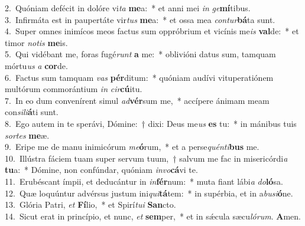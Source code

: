 {2.~}Quóniam defécit in dolóre vi\textit{ta} \textbf{me}a:~* et anni mei \textit{in} \textit{ge}\textbf{mí}tibus.\\
{3.~}Infirmáta est in paupertáte vir\textit{tus} \textbf{me}a:~* et ossa mea \textit{con}\textit{tur}\textbf{bá}ta sunt.\\
{4.~}Super omnes inimícos meos factus sum oppróbrium et vicínis me\textit{is} \textbf{val}de:~* et timor \textit{no}\textit{tis} \textbf{me}is.\\
{5.~}Qui vidébant me, foras fugé\textit{runt} \textbf{a} me:~* oblivióni datus sum, tamquam mórtu\textit{us} \textit{a} \textbf{cor}de.\\
{6.~}Factus sum tamquam \textit{vas} \textbf{pér}ditum:~* quóniam audívi vituperatiónem multórum commorántium \textit{in} \textit{cir}\textbf{cú}itu.\\
{7.~}In eo dum convenírent simul \textit{ad}\textbf{vér}sum me,~* accípere ánimam meam con\textit{si}\textit{li}\textbf{á}ti sunt.\\
{8.~}Ego autem in te sperávi, Dómine:~† dixi: Deus me\textit{us} \textbf{es} tu:~* in mánibus tuis \textit{sor}\textit{tes} \textbf{me}æ.\\
{9.~}Eripe me de manu inimicórum \textit{me}\textbf{ó}rum,~* et a perse\textit{quén}\textit{ti}\textbf{bus} me.\\
{10.~}Illústra fáciem tuam super servum tuum,~† salvum me fac in misericórdi\textit{a} \textbf{tu}a:~* Dómine, non confúndar, quóniam \textit{in}\textit{vo}\textbf{cá}vi te.\\
{11.~}Erubéscant ímpii, et deducántur in \textit{in}\textbf{fér}num:~* muta fiant lábi\textit{a} \textit{do}\textbf{ló}sa.\\
{12.~}Quæ loquúntur advérsus justum ini\textit{qui}\textbf{tá}tem:~* in supérbia, et in a\textit{bu}\textit{si}\textbf{ó}ne.\\
{13.~}Glória Patri, \textit{et} \textbf{Fí}lio,~* et Spirí\textit{tu}\textit{i} \textbf{San}cto.\\
{14.~}Sicut erat in princípio, et nunc, \textit{et} \textbf{sem}per,~* et in sǽcula sæcu\textit{ló}\textit{rum}. \textbf{A}men.\\

